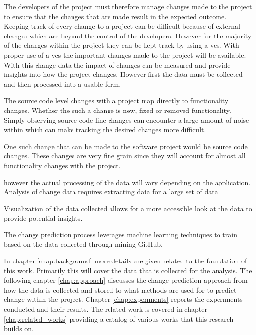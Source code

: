The developers of the project must therefore manage changes made to the project to ensure that the changes that are made result in the expected outcome. Keeping track of every change to a project can be difficult because of external changes which are beyond the control of the developers. However for the majority of the changes within the project they can be kept track by using a \gls{vcs}. With proper use of a \gls{vcs} the important changes made to the project will be available. With this change data the impact of changes can be measured and provide insights into how the project changes. However first the data must be collected and then processed into a usable form.

The source code level changes with a project map directly to functionality changes. Whether the such a change is new, fixed or removed functionality. Simply observing source code line changes can encounter a large amount of noise within which can make tracking the desired changes more difficult.

One such change that can be made to the software project would be source code changes. These changes are very fine grain since they will account for almost all functionality changes with the project. 

however the actual processing of the data will vary depending on the application. Analysis of change data requires extracting data for a large set of data.

Visualization of the data collected allows for a more accessible look at the data to provide potential insights.

The change prediction process leverages machine learning techniques to train based on the data collected through mining GitHub.

In chapter \ref{chap:background} more details are given related to the foundation of this work. Primarily this will cover the data that is collected for the analysis. The following chapter \ref{chap:approach} discusses the change prediction approach from how the data is collected and stored to what methods are used for to predict change within the project. Chapter \ref{chap:experiments} reports the experiments conducted and their results. The related work is covered in chapter \ref{chap:related_works} providing a catalog of various works that this research builds on.